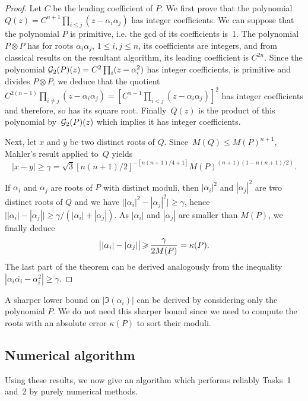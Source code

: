 \begin{proof}
Let $C$ be the leading coefficient of $P$. We first prove that
the polynomial $Q(z)=C^{n+1} \prod_{i \leq j} (z-\alpha_i \alpha_j)$ has
integer coefficients. We can suppose that the polynomial $P$ is
primitive, i.e. the gcd of its coefficients is~1. The polynomial
$P\otimes P$ has for roots $\alpha_i \alpha_j$, $1
\leq i,j \leq n$, its coefficients are integers, and from classical
results on the resultant algorithm, 
its leading coefficient is 
$C^{2n}$. Since the polynomial ${\cal G}_2(P)(z)=C^2\prod_i
(z-\alpha_i^2)$ has integer coefficients, 
is primitive and divides $P\otimes P$, we deduce
that the quotient $C^{2(n-1)} \prod_{i \not = j} (z-\alpha_i
\alpha_j)=[C^{n-1}\prod_{i<j}(z-\alpha_i \alpha_j)]^2$ has integer
coefficients and therefore, so has its square root.
Finally~$Q(z)$ is the product of this polynomial by~${\cal G}_2(P)(z)$
which implies it
has integer coefficients.

Next, let $x$ and $y$ be two distinct roots of $Q$. Since~$M(Q)\le
M(P)^{n+1}$, Mahler's
result applied to~$Q$ yields
\begin{equation}\label{minoration}
|x-y| \geq \gamma=\sqrt{3} \left[ n(n+1)/2 \right]^{-[n(n+1)/4 +1]}
M(P)^{(n+1)(1-n(n+1)/2)}.
\end{equation}
\par If $\alpha_i$ and $\alpha_j$ are roots of $P$ with distinct
moduli, then $|\alpha_i|^2$ and $|\alpha_j|^2$ are two distinct
roots of $Q$ and we have $\bigl||\alpha_i|^2-|\alpha_j|^2\bigr| \geq \gamma$,
hence $\bigl||\alpha_i|-|\alpha_j|\bigr| \geq
\gamma/(|\alpha_i|+|\alpha_j|)$. As $|\alpha_i|$ and $|\alpha_j|$ are
smaller than $M(P)$, we finally deduce
$$ \bigl||\alpha_i| -|\alpha_j|\bigr|  \geq {\gamma \over 2
M(P)}=\kappa(P).$$
The last part of the theorem can be derived analogously from
the inequality $|\alpha_i \overline{\alpha_i} - \alpha_i^2| \geq \gamma$.
\end{proof}

A sharper lower bound on $|\Im(\alpha_i)|$ can be derived
by considering only the polynomial $P$. We do not need this sharper bound
since we need to compute the roots with an absolute error $\kappa(P)$
to sort their moduli.

\subsection{Numerical algorithm}
Using these results, we now give an algorithm
which performs reliably  Tasks~1 and~2 by purely numerical methods.

